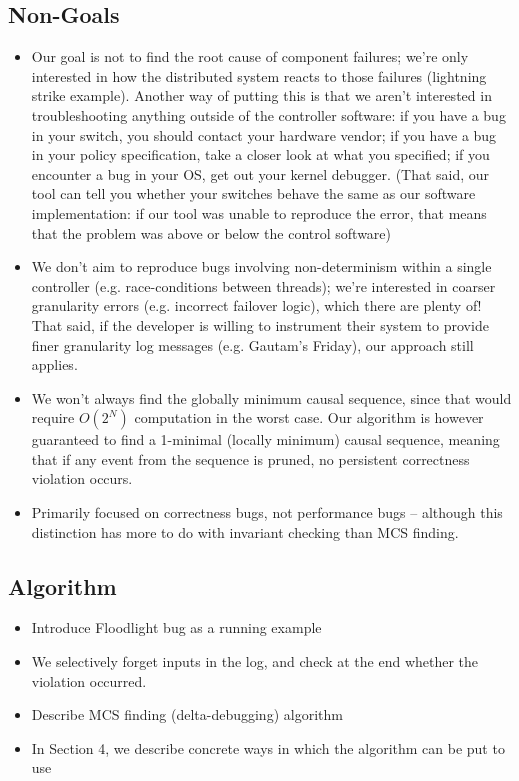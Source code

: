 \subsection{Non-Goals}
\begin{itemize}
\item Our goal is not to find the root cause of component failures; we're only interested in how the distributed system reacts to those failures (lightning strike example). Another way of putting this is that we aren't interested in troubleshooting anything outside of the controller software: if you have a bug in your switch, you should contact your hardware vendor; if you have a bug in your policy specification, take a closer look at what you specified; if you encounter a bug in your OS, get out your kernel debugger. (That said, our tool can tell you whether your switches behave the same as our software implementation: if our tool was unable to reproduce the error, that means that the problem was above or below the control software)
\item We don't aim to reproduce bugs involving non-determinism within a single controller (e.g. race-conditions between threads); we're interested in coarser granularity errors (e.g. incorrect failover logic), which there are plenty of! That said, if the developer is willing to instrument their system to provide finer granularity log messages (e.g. Gautam's Friday), our approach still applies.
\item We won't always find the globally minimum causal sequence, since that
would require $O(2^N)$ computation in the worst case. Our algorithm is however guaranteed to find a 1-minimal (locally minimum) causal sequence, meaning that if any event from the sequence is pruned, no persistent correctness violation occurs.
\item Primarily focused on correctness bugs, not performance bugs -- although this distinction has more to do with invariant checking than MCS finding.
\end{itemize}

\subsection{Algorithm}
\begin{itemize}
\item Introduce Floodlight bug as a running example
\item We selectively forget inputs in the log, and check at the end whether the violation occurred.
\item Describe MCS finding (delta-debugging) algorithm
\item In Section 4, we describe concrete ways in which the algorithm can be put to use
\end{itemize}

